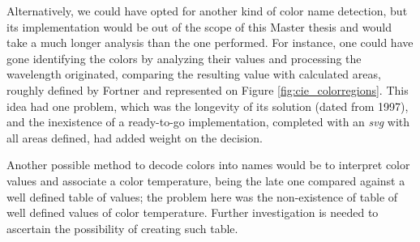 %
Alternatively, we could have opted for another kind of color name detection, but its implementation would be out of the scope of this Master thesis and would take a much longer
analysis than the one performed. For instance, one could have gone identifying the colors by analyzing their values and processing the wavelength originated, comparing the resulting
value with calculated areas, roughly defined by Fortner \cite{Fortner1997} and represented on Figure \ref{fig:cie_colorregions}. This idea had one problem, which was the longevity
of its solution (dated from 1997), and the inexistence of a ready-to-go implementation, completed with an \emph{svg} with all areas defined, had added weight on the decision. \par
%
Another possible method to decode colors into names would be to interpret color values and associate a color temperature, being the late one compared against a well defined table
of values; the problem here was the non-existence of table of well defined values of color temperature. Further investigation is needed to ascertain the possibility of creating such table.
%
